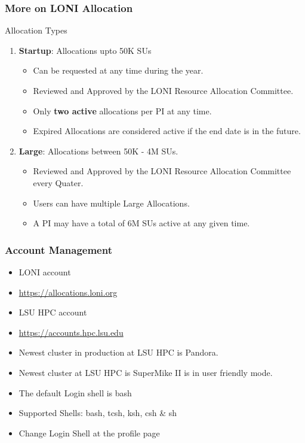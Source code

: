 \documentclass[slidestop,mathserif,compress,xcolor=svgnames,table]{beamer}
\newenvironment{bblock}[0]
{
\begin{beamerboxesrounded}[upper=uppercol1,lower=lowercol1,shadow=true]}
{\end{beamerboxesrounded}}
\newenvironment{eblock}[0]
{
\begin{beamerboxesrounded}[upper=uppercol2,lower=lowercol2,shadow=true]}
{\end{beamerboxesrounded}}
\begin{document}
\begin{frame}
  \frametitle{\small More on LONI Allocation}
  \begin{bblock}{Allocation Types}
    \begin{enumerate}
      \item \textbf{Startup}: Allocations upto 50K SUs
      \begin{itemize}
        \item Can be requested at any time during the year.
        \item Reviewed and Approved by the LONI Resource Allocation Committee.
        \item Only \textbf{two active} allocations per PI at any time.
        \item Expired Allocations are considered active if the end date is in the future.
      \end{itemize}
      \item \textbf{Large}: Allocations between 50K - 4M SUs.
      \begin{itemize}
        \item Reviewed and Approved by the LONI Resource Allocation Committee every Quater.
        \item Users can have multiple Large Allocations.
        \item A PI may have a total of 6M SUs active at any given time.
      \end{itemize}
    \end{enumerate}
  \end{bblock}
\end{frame}

\begin{frame}
  \frametitle{\small Account Management}
  \begin{bblock}{}
    \begin{itemize}
    \item LONI account
    \item[] \url{https://allocations.loni.org}
    \item LSU HPC account
    \item[] \url{https://accounts.hpc.lsu.edu}
    \item Newest cluster in production at LSU HPC is Pandora.
    \item Newest cluster at LSU HPC is SuperMike II is in user friendly mode. 
    \end{itemize}
  \end{bblock}
  
  \begin{eblock}{}
    \begin{itemize}
    \item The default Login shell is bash
    \item Supported Shells: bash, tcsh, ksh, csh \& sh
    \item Change Login Shell at the profile page
    \end{itemize}
  \end{eblock}
\end{frame}
\end{document}
